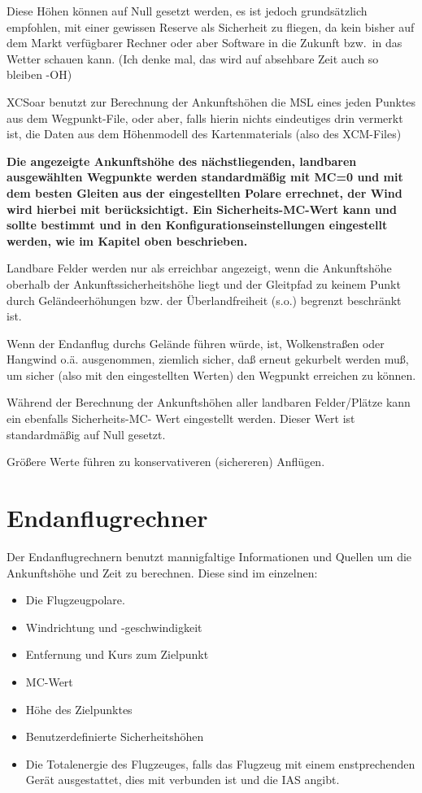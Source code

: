 \warning
Diese Höhen können auf  Null gesetzt werden, es ist jedoch grundsätzlich empfohlen, mit einer gewissen Reserve als Sicherheit
zu fliegen, da kein bisher auf dem Markt verfügbarer Rechner oder aber Software in die Zukunft bzw.\  in das Wetter schauen kann.
(Ich denke mal, das wird auf absehbare Zeit auch so bleiben -\textsf{OH})

\textsf{XCSoar} benutzt zur Berechnung der Ankunftshöhen die MSL eines jeden Punktes aus dem Wegpunkt-File, oder aber,
falls hierin nichts eindeutiges drin vermerkt ist, die Daten aus dem Höhenmodell des Kartenmaterials (also des XCM-Files)

\textbf{Die angezeigte Ankunftshöhe  des nächstliegenden, landbaren ausgewählten Wegpunkte werden standardmäßig
mit MC=0  und mit dem besten Gleiten aus der eingestellten Polare errechnet, der Wind wird hierbei mit berücksichtigt.
Ein Sicherheits-MC-Wert kann und sollte bestimmt und in den Konfigurationseinstellungen eingestellt werden, wie im Kapitel
oben beschrieben.}



Landbare Felder werden nur als erreichbar angezeigt, wenn die Ankunftshöhe oberhalb  der Ankunftssicherheitshöhe liegt und der
Gleitpfad zu keinem Punkt durch Geländeerhöhungen bzw. der Überlandfreiheit (s.o.) begrenzt beschränkt ist.


Wenn der Endanflug durchs Gelände führen würde, ist, Wolkenstraßen oder Hangwind o.ä. ausgenommen,
ziemlich sicher, daß erneut gekurbelt werden muß, um sicher (also mit den eingestellten Werten) den
Wegpunkt erreichen zu können.

Während der Berechnung der Ankunftshöhen aller landbaren Felder/Plätze kann ein ebenfalls
Sicherheits-MC- Wert eingestellt werden. Dieser Wert ist standardmäßig auf Null gesetzt.

Größere Werte führen zu konservativeren (sichereren) Anflügen.

\section{Endanflugrechner}

Der Endanflugrechnern benutzt mannigfaltige Informationen und Quellen um die Ankunftshöhe und Zeit zu berechnen.
Diese sind im einzelnen:

\begin{itemize}
\item Die Flugzeugpolare.
\item Windrichtung und -geschwindigkeit
\item Entfernung und Kurs zum Zielpunkt
\item MC-Wert
\item Höhe des Zielpunktes
\item Benutzerdefinierte Sicherheitshöhen
\item Die Totalenergie des Flugzeuges, falls das Flugzeug mit einem enstprechenden Gerät ausgestattet, dies mit \xc
verbunden ist und die IAS angibt.
\end{itemize}

